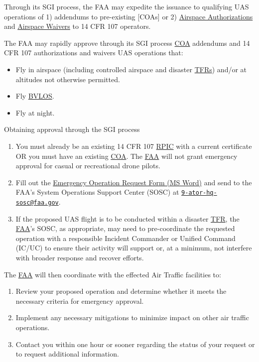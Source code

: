 \documentclass[
]{book}
\providecommand{\tightlist}{%
  \setlength{\itemsep}{0pt}\setlength{\parskip}{0pt}}
\begin{document}
Through its SGI process, the FAA may expedite the issuance to qualifying UAS operations of 1) addendums to pre-existing {[}COAs{]} or 2) \protect\hyperlink{AA}{Airspace Authorizations} and \protect\hyperlink{AW}{Airspace Waivers} to 14 CFR 107 operators.

The FAA may rapidly approve through its SGI process \protect\hyperlink{COA}{COA} addendums and 14 CFR 107 authorizations and waivers UAS operations that:

\begin{itemize}
\tightlist
\item
  Fly in airspace (including controlled airspace and disaster \protect\hyperlink{TFR}{TFRs}) and/or at altitudes not otherwise permitted.
\item
  Fly \protect\hyperlink{BVLOS}{BVLOS}.
\item
  Fly at night.
\end{itemize}

Obtaining approval through the SGI process

\begin{enumerate}
\def\labelenumi{\arabic{enumi}.}
\tightlist
\item
  You must already be an existing 14 CFR 107 \protect\hyperlink{RPIC}{RPIC} with a current certificate OR you must have an existing \protect\hyperlink{COA}{COA}. The \protect\hyperlink{FAA}{FAA} will not grant emergency approval for casual or recreational drone pilots.
\item
  Fill out the \href{https://www.faa.gov/uas/getting_started/emergency_approval/media/UAS-SGI_waiver_approval_request_form.docx}{Emergency Operation Request Form (MS Word)} and send to the FAA's System Operations Support Center (SOSC) at \href{mailto:9-ator-hq-sosc@faa.gov}{\nolinkurl{9-ator-hq-sosc@faa.gov}}.
\item
  If the proposed UAS flight is to be conducted within a disaster \protect\hyperlink{TFR}{TFR}, the \protect\hyperlink{FAA}{FAA}'s SOSC, as appropriate, may need to pre-coordinate the requested operation with a responsible Incident Commander or Unified Command (IC/UC) to ensure their activity will support or, at a minimum, not interfere with broader response and recover efforts.
\end{enumerate}

The \protect\hyperlink{FAA}{FAA} will then coordinate with the effected Air Traffic facilities to:

\begin{enumerate}
\def\labelenumi{\arabic{enumi}.}
\tightlist
\item
  Review your proposed operation and determine whether it meets the necessary criteria for emergency approval.
\item
  Implement any necessary mitigations to minimize impact on other air traffic operations.
\item
  Contact you within one hour or sooner regarding the status of your request or to request additional information.
\end{enumerate}
\end{document}
